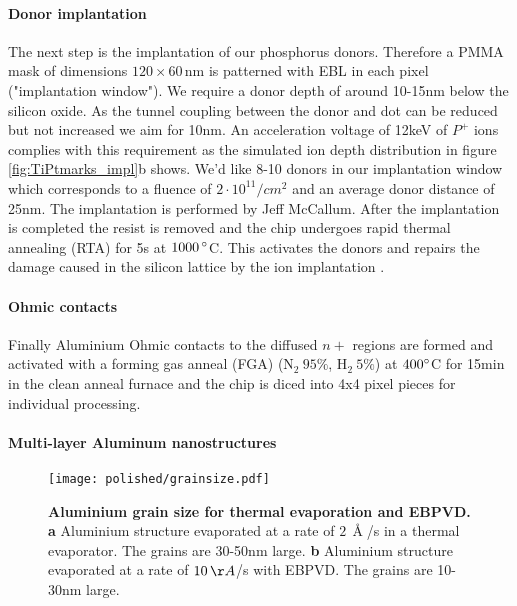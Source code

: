 \paragraph*{Donor implantation}
The next step is the implantation of our phosphorus donors. Therefore a PMMA mask of dimensions  $120\times60\,$nm is patterned with EBL in each pixel ("implantation window"). We require a donor depth of around 10-15nm below the silicon oxide. As the tunnel coupling between the donor and dot can be reduced but not increased we aim for 10nm. An acceleration voltage of 12keV of $P^+$ ions complies with this requirement as the simulated ion depth distribution in figure \ref{fig:TiPtmarks_impl}b shows. We'd like 8-10 donors in our implantation window which corresponds to a fluence of $2\cdot 10^{11}/cm^2$ and an average donor distance of 25nm. The implantation is performed by Jeff McCallum. After the implantation is completed the resist is removed and the chip undergoes rapid thermal annealing (RTA) for 5s at $1000\,\degree$C. This activates the donors and repairs the damage caused in the silicon lattice by the ion implantation \cite{McCamey2005}. 

\paragraph*{Ohmic contacts}
Finally Aluminium Ohmic contacts to the diffused $n+$ regions are formed and activated with a forming gas anneal (FGA) (N$_2\ 95\%$, H$_2\ 5\%$) at $400\degree$C for 15min in the clean anneal furnace and the chip is diced into 4x4 pixel pieces for individual processing. 

\paragraph*{Multi-layer Aluminum nanostructures}

\begin{figure}
	\centering
	\texttt{[image: polished/grainsize.pdf]}
	\caption[Aluminium grain size for thermal evaporation and EBPVD]{\textbf{Aluminium grain size for thermal evaporation and EBPVD. a} Aluminium structure evaporated at a rate of $2\,\Angstrom$/s in a thermal evaporator. The grains are 30-50nm large. \textbf{b} Aluminium structure evaporated at a rate of $10\,\AA$/s with EBPVD. The grains are 10-30nm large. }
	\label{fig:grainsize}
\end{figure}

